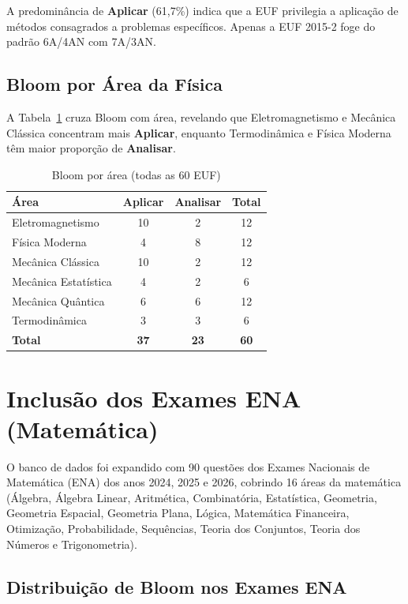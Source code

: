 \documentclass[12pt,a4paper]{article}
\newcommand{\bloom}[1]{\textcolor{verdeexame}{\textbf{#1}}}
\begin{document}
A predominância de \bloom{Aplicar} (61,7\%) indica que a EUF privilegia
a aplicação de métodos consagrados a problemas específicos. Apenas a
EUF 2015-2 foge do padrão 6A/4AN com 7A/3AN.

\subsection{Bloom por Área da Física}

A Tabela~\ref{tab:bloom_area} cruza Bloom com área, revelando que
Eletromagnetismo e Mecânica Clássica concentram mais \bloom{Aplicar},
enquanto Termodinâmica e Física Moderna têm maior proporção de
\bloom{Analisar}.

\begin{table}[H]
\centering
\caption{Bloom por área (todas as 60 EUF)}
\label{tab:bloom_area}
\begin{tabular}{lccc}
\toprule
\textbf{Área} & \textbf{Aplicar} & \textbf{Analisar} & \textbf{Total} \\
\midrule
Eletromagnetismo & 10 & 2 & 12 \\
Física Moderna & 4 & 8 & 12 \\
Mecânica Clássica & 10 & 2 & 12 \\
Mecânica Estatística & 4 & 2 & 6 \\
Mecânica Quântica & 6 & 6 & 12 \\
Termodinâmica & 3 & 3 & 6 \\
\midrule
\textbf{Total} & \textbf{37} & \textbf{23} & \textbf{60} \\
\bottomrule
\end{tabular}
\end{table}

\section{Inclusão dos Exames ENA (Matemática)}

O banco de dados foi expandido com 90 questões dos Exames Nacionais de
Matemática (ENA) dos anos 2024, 2025 e 2026, cobrindo 16 áreas da
matemática (Álgebra, Álgebra Linear, Aritmética, Combinatória,
Estatística, Geometria, Geometria Espacial, Geometria Plana, Lógica,
Matemática Financeira, Otimização, Probabilidade, Sequências,
Teoria dos Conjuntos, Teoria dos Números e Trigonometria).

\subsection{Distribuição de Bloom nos Exames ENA}
\end{document}

